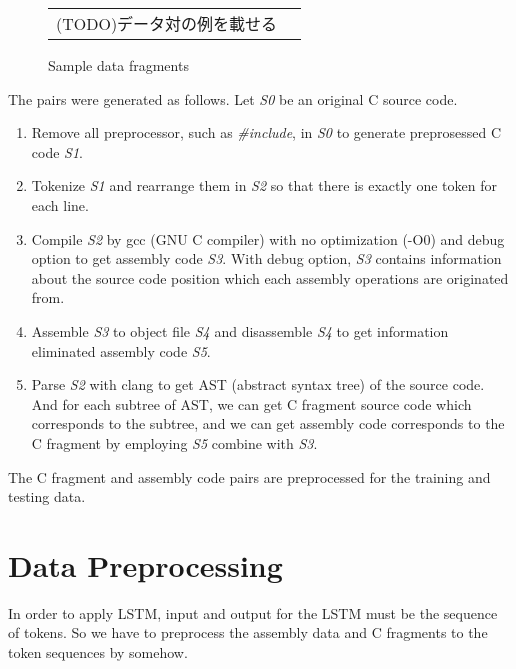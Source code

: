 \documentclass[senior,final,11pt]{iscs-thesis}
\begin{document}
\begin{figure}
	\begin{tabular}{cc}
		(TODO)データ対の例を載せる
	\end{tabular}
	\caption{Sample data fragments}
	\label{fig:pairsoffragments}
\end{figure}

The pairs were generated as follows. Let {\sl S0} be an original C source code.
\begin{enumerate}
\item Remove all preprocessor, such as {\sl \#include}, in {\sl S0} to generate preprosessed C code {\sl S1}. 
\item Tokenize {\sl S1} and rearrange them in {\sl S2} so that there is exactly one token for each line. 
\item 
Compile {\sl S2} by gcc (GNU C compiler) with no optimization (-O0) and debug option to get assembly code {\sl S3}. 
With debug option, {\sl S3} contains information about the source code position which each assembly operations are originated from.
\item Assemble {\sl S3} to object file {\sl S4} and disassemble {\sl S4} to get information eliminated assembly code {\sl S5}.
\item 
Parse {\sl S2} with clang to get AST (abstract syntax tree) of the source code. 
And for each subtree of AST, we can get C fragment source code which corresponds to the subtree, 
and we can get assembly code corresponds to the C fragment by employing {\sl S5} combine with {\sl S3}.
\end{enumerate}

The C fragment and assembly code pairs are preprocessed for the training and testing data.


\section{Data Preprocessing}

In order to apply LSTM, input and output for the LSTM must be the sequence of tokens. 
So we have to preprocess the assembly data and C fragments to the token sequences by somehow.
\end{document}
